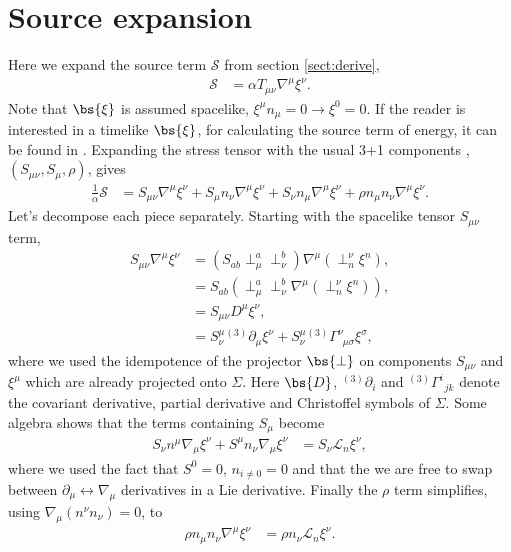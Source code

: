 \section{Source expansion} \label{sect:source}
Here we expand the source term $\mathcal{S}$ from section \ref{sect:derive},
\begin{align}
\mathcal{S} &= \alpha T_{\mu\nu} \nabla^\mu \xi^\nu.
\end{align}
Note that $\bs{\xi}$ is assumed spacelike, $\xi^\mu n_\mu = 0\rightarrow \xi^0=0$. If the reader is interested in a timelike $\bs{\xi}$, for calculating the source term of energy, it can be found in \cite{clough2021continuity}. Expanding the stress tensor with the usual 3+1 components \cite{gourgoulhon20073+}, \cite{alcubierre2008introduction} $(S_{\mu\nu}, S_{\mu}, \rho)$, gives
\begin{align}
\frac{1}{\alpha}\mathcal{S} &= S_{\mu\nu}\nabla^\mu \xi^\nu + S_\mu n_\nu \nabla^\mu \xi^\nu + S_\nu n_\mu \nabla^\mu \xi^\nu + \rho n_\mu n_\nu\nabla^\mu \xi^\nu.
\end{align}
Let's decompose each piece separately. Starting with the spacelike tensor $S_{\mu\nu}$ term,
\begin{align}
S_{\mu\nu}\nabla^\mu \xi^\nu &= (S_{ab}\perp^a_\mu \perp^b_\nu )\nabla^\mu ( \perp^\nu_n \xi^n ),  \\
&= S_{ab}(\perp^a_\mu \perp^b_\nu \nabla^\mu ( \perp^\nu_n \xi^n )),  \\
&= S_{\mu\nu} D^\mu \xi^\nu,  \\
\label{eq:S1}&= S^\mu_{\nu}{}^{(3)}\partial_\mu \xi^\nu + S^\mu_{\nu} {}^{(3)}\Gamma^\nu_{\,\,\,\mu \sigma} \xi^\sigma,
\end{align}
where we used the idempotence of the projector $\bs{\perp}$ on components $S_{\mu\nu}$ and $\xi^\mu$ which are already projected onto $\Sigma$. Here $\bs{D}$, ${{}^{(3)}\partial}_i$ and ${}^{(3)}\Gamma^i_{\,\,\,jk}$ denote the covariant derivative, partial derivative and Christoffel symbols of $\Sigma$. Some algebra shows that the terms containing $S_\mu$ become
\begin{align} 
\label{eq:S2}S_\nu n^\mu \nabla_\mu \xi^\nu + S^\mu n_\nu \nabla_\mu \xi^\nu  &= S_\nu \mathcal{L}_n \xi^\nu, 
\end{align}
where we used the fact that $S^0 = 0$, $n_{i\neq0}=0$ and that the we are free to swap between $\partial_\mu \leftrightarrow \nabla_\mu$ derivatives in a Lie derivative. Finally the $\rho$ term simplifies, using $\nabla_\mu (n^\nu n_\nu) = 0$, to
\begin{align} \label{eq:S3}
\rho n_\mu n_\nu\nabla^\mu \xi^\nu &= \rho n_\nu \mathcal{L}_n \xi^\nu.
\end{align}
